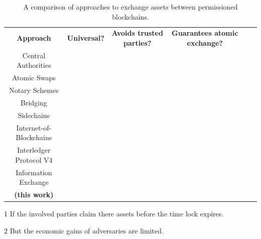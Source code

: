 \begin{table}[t]
	\centering
	\footnotesize
	\begin{threeparttable}
		\begin{tabular}{ c c c c c c } 
			\hline
			\textbf{Approach} & \textbf{Universal?} & \textbf{Avoids trusted parties?} & \textbf{Guarantees atomic exchange?} \\
			Central Authorities & \greencheck & \redcross & \redcross \\
			Atomic Swaps & \redcross & \greencheck & \greencheck\tnote{1} \\
			Notary Schemes & \greencheck & \redcross & \redcross \\
			Bridging & \redcross & \greencheck & \redcross \\
			Sidechains & \redcross & \greencheck & \greencheck \\
			Internet-of-Blockchains & \redcross & \greencheck & \greencheck \\
			Interledger Protocol V4 & \greencheck & \redcross & \redcross \\
			Information Exchange & \redcross & \greencheck & \greencheck \\ \hline
			\textbf{\ModelName{} (this work)} & \greencheck & \greencheck & \redcross\tnote{2} \\
			\hline
		\end{tabular}
		\begin{tablenotes}
			\item [1] If the involved parties claim there assets before the time lock expires.
			\item [2] But the economic gains of adversaries are limited.
		\end{tablenotes}
	\end{threeparttable}
	\caption{A comparison of approaches to exchange assets between permissioned blockchains.}
	\label{tbl:cross_chain_trading_mechanisms}
\end{table}

